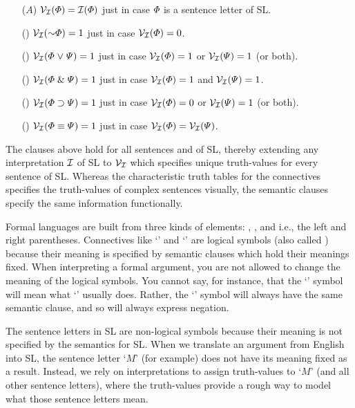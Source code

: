 \begin{enumerate}[labelsep=.15in]
  \item[($A$)] $\mathcal{V}_{\mathcal{I}}(\varPhi{})=\mathcal{I}(\varPhi{})$ just in case $\varPhi{}$ is a sentence letter of SL.
  \item[(\enot)] $\V{\I}(\enot\metaA{})=1$ just in case $\mathcal{V}_{\mathcal{I}}(\varPhi{})=0$.
  \item[(\eor)] $\mathcal{V}_{\mathcal{I}}(\varPhi{} \mkern1mu\vee\mkern1mu \varPsi{})=1$ just in case $\mathcal{V}_{\mathcal{I}}(\varPhi{})=1$ or $\mathcal{V}_{\mathcal{I}}(\varPsi{})=1$ (or both).
  \item[(\eand)] $\mathcal{V}_{\mathcal{I}}(\varPhi{} \mathrel\& \varPsi{})=1$ just in case $\mathcal{V}_{\mathcal{I}}(\varPhi{})=1$ and $\mathcal{V}_{\mathcal{I}}(\varPsi{})=1$.
  \item[(\eif)] $\mathcal{V}_{\mathcal{I}}(\varPhi{} \supset \varPsi{})=1$ just in case $\mathcal{V}_{\mathcal{I}}(\varPhi{})=0$ or $\mathcal{V}_{\mathcal{I}}(\varPsi{})=1$ (or both).
  \item[(\eiff)] $\mathcal{V}_{\mathcal{I}}(\varPhi{} \equiv \varPsi{})=1$ just in case $\mathcal{V}_{\mathcal{I}}(\varPhi{})=\mathcal{V}_{\mathcal{I}}(\varPsi{})$.
\end{enumerate}

The clauses above hold for all sentences \metaA{} and \metaB{} of SL, thereby extending any interpretation $\mathcal{I}$ of SL to $\mathcal{V}_{\mathcal{I}}$ which specifies unique truth-values for every sentence of SL.
Whereas the characteristic truth tables for the connectives specifies the truth-values of complex sentences visually, the semantic clauses specify the same information functionally.

Formal languages are built from three kinds of elements: , , and  i.e., the left and right parentheses.
Connectives like `\eand' and `\eif' are logical symbols (also called ) because their meaning is specified by semantic clauses which hold their meanings fixed.
When interpreting a formal argument, you are not allowed to change the meaning of the logical symbols.
You cannot say, for instance, that the `\enot' symbol will mean what `\eand' usually does.
Rather, the `\enot' symbol will always have the same semantic clause, and so will always express negation.

The sentence letters in SL are non-logical symbols because their meaning is not specified by the semantics for SL.
When we translate an argument from English into SL, the sentence letter `$M$' (for example) does not have its meaning fixed as a result.
Instead, we rely on interpretations to assign truth-values to `$M$' (and all other sentence letters), where the truth-values provide a rough way to model what those sentence letters mean.

